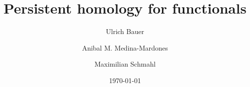 \documentclass{amsart}
\title{Persistent homology for functionals}
\author[U.~Bauer]{Ulrich Bauer}
\author[A.~Medina-Mardones]{Anibal M. Medina-Mardones}
\author[M.~Schmahl]{Maximilian Schmahl}
\date{\today}
\begin{document}
	
	\maketitle
	
	
	
	
	
	\appendix
	
	
	
	\sloppy
	\printbibliography
\end{document}
